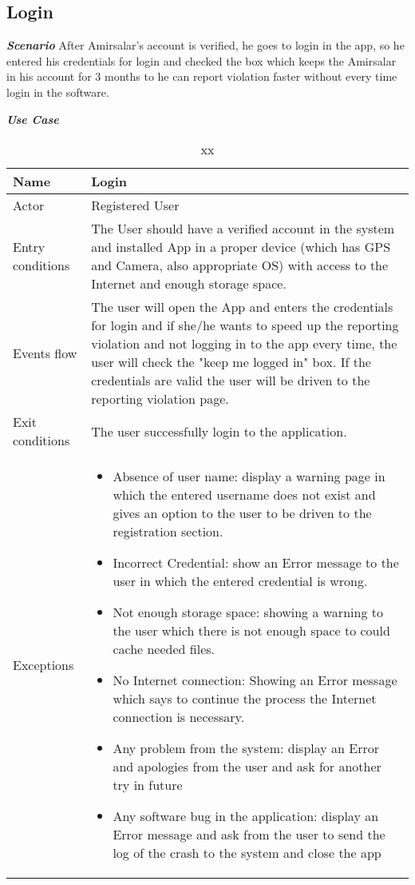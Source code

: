 \subsection{Login}

\emph{\textbf{Scenario}}
After Amirsalar's account is verified, he goes to login in the app, so he entered his credentials for login and checked the box which keeps the Amirsalar in his account for 3 months to he can report violation faster without every time login in the software.

\emph{\textbf{Use Case}}

\begin{table}[!hbtp]
\footnotesize
\centering
\settowidth{}
\setlength\extrarowheight{2pt}
\begin{tabulary}{\textwidth}{|J|J|}
\hline
Name             & Login \\
\hline
Actor            & Registered User \\
\hline
Entry conditions & The User should have a verified account in the system and installed App in a proper device (which has GPS and Camera, also appropriate OS) with access to the Internet and enough storage space.\\
\hline 
Events flow      & The user will open the App and enters the credentials for login and if she/he wants to speed up the reporting violation and not logging in to the app every time, the user will check the "keep me logged in" box. If the credentials are valid the user will be driven to the reporting violation page.\\
\hline 
Exit conditions  & The user successfully login to the application.\\
\hline 
Exceptions       & 
\begin{minipage}[t]{0.8\textwidth}
\begin{itemize} 
\item Absence of user name: display a warning page in which the entered username does not exist and gives an option to the user to be driven to the registration section.
\item Incorrect Credential: show an Error message to the user in which the entered credential is wrong.
\item Not enough storage space: showing a warning to the user which there is not enough space to could cache needed files.
\item No Internet connection: Showing an Error message which says to continue the process the Internet connection is necessary.
\item Any problem from the system: display an Error and apologies from the user and ask for another try in future
\item Any software bug in the application: display an Error message and ask from the user to send the log of the crash to the system and close the app
\end{itemize}
\end{minipage}\\
\hline
\end{tabulary}
\caption{\label{tab:xx}xx}
\end{table}

